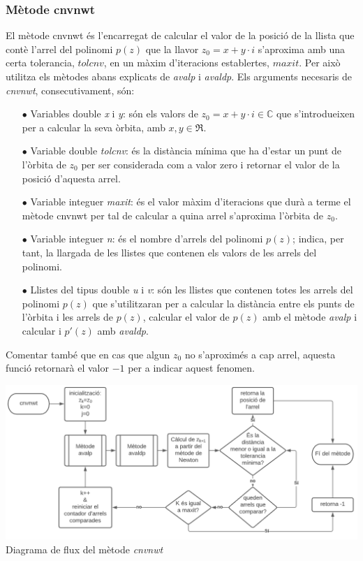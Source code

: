 \documentclass[12pt]{report}
\begin{document}
\subsubsection{Mètode cnvnwt}
El mètode cnvnwt és l'encarregat de calcular el valor de la posició de la llista que contè l'arrel del polinomi $p(z)$ que la llavor $z_0=x+y\cdot i$ s'aproxima amb una certa tolerancia, $tolcnv$, en un màxim d'iteracions establertes, $maxit$. Per això utilitza els mètodes abans explicats de \textit{avalp} i \textit{avaldp}. Els arguments necesaris de \textit{cnvnwt}, consecutivament, són:
\begin{itemize}
    \item [$\bullet$] Variables double \textit{x} i \textit{y}: són els valors de $z_0=x+y\cdot i\in\mathbb{C}$ que s'introdueixen per a calcular la seva òrbita, amb $x,y\in\Re$.
\item [$\bullet$] Variable double \textit{tolcnv}: és la distància mínima que ha d'estar un punt de l'òrbita de $z_0$ per ser considerada com a valor zero i retornar el valor de la posició d'aquesta arrel.
\item [$\bullet$] Variable integuer \textit{maxit}: és el valor màxim d'iteracions que durà a terme el mètode cnvnwt per tal de calcular a quina arrel s'aproxima l'òrbita de $z_0$.
\item [$\bullet$] Variable integuer \textit{n}: és el nombre d'arrels del polinomi $p(z)$; indica, per tant, la llargada de les llistes que contenen els valors de les arrels del polinomi.
\item [$\bullet$] Llistes del tipus double \textit{u} i \textit{v}: són les llistes que contenen totes les arrels del polinomi $p(z)$ que s'utilitzaran per a calcular la distància entre els punts de l'òrbita i les arrels de $p(z)$, calcular el valor de $p(z)$ amb el mètode \textit{avalp} i calcular i $p'(z)$ amb \textit{avaldp}.
\end{itemize}
Comentar també que en cas que algun $z_0$ no s'aproximés a cap arrel, aquesta funció retornarà el valor $-1$ per a indicar aquest fenomen.

\begin{center}
    \includegraphics[width=1\textwidth]{UML_cnvnwt.PNG}
     \newline
Diagrama de flux del mètode \textit{cnvnwt}
\label{fig:UML_avalp}
\end{center}
\end{document}
